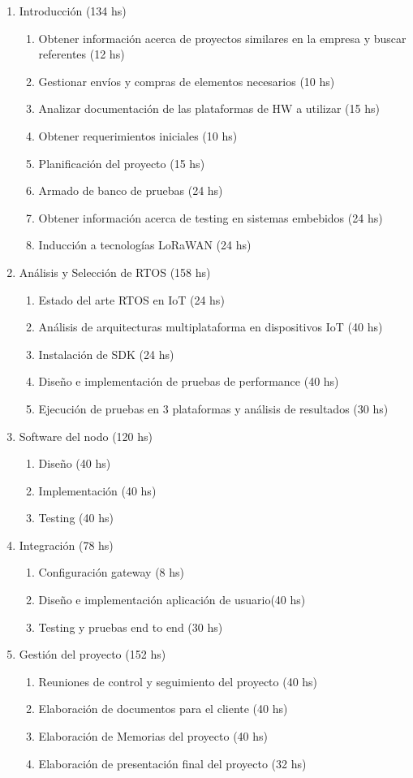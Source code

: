 \documentclass[11pt]{charter}
\begin{document}
\begin{enumerate}
\item Introducción (134 hs)
	\begin{enumerate}
	\item Obtener información acerca de proyectos similares en la empresa y buscar referentes (12 hs)
	\item Gestionar envíos y compras de elementos necesarios (10 hs)
	\item Analizar documentación de las plataformas de HW a utilizar (15 hs)
	\item Obtener requerimientos iniciales (10 hs)
	\item Planificación del proyecto (15 hs)
	\item Armado de banco de pruebas (24 hs)
	\item Obtener información acerca de testing en sistemas embebidos (24 hs)
	\item Inducción a tecnologías LoRaWAN (24 hs)
	\end{enumerate}
\item Análisis y Selección de RTOS (158 hs)
	\begin{enumerate}
	\item Estado del arte RTOS en IoT (24 hs)
	\item Análisis de arquitecturas multiplataforma en dispositivos IoT (40 hs)
	\item Instalación de SDK (24 hs)
	\item Diseño e implementación de pruebas de performance (40 hs)
	\item Ejecución de pruebas en 3 plataformas y análisis de resultados (30 hs)
	\end{enumerate}	
\item Software del nodo (120 hs)
	\begin{enumerate}
	\item Diseño (40 hs)
	\item Implementación (40 hs)
	\item Testing (40 hs)
	\end{enumerate}
\item Integración (78 hs)
	\begin{enumerate}
	\item Configuración gateway (8 hs)
	\item Diseño e implementación aplicación de usuario(40 hs)
	\item Testing y pruebas end to end (30 hs)
	\end{enumerate}
\item Gestión del proyecto (152 hs)
	\begin{enumerate}
	\item Reuniones de control y seguimiento del proyecto (40 hs)
	\item Elaboración de documentos para el cliente (40 hs)
	\item Elaboración de Memorias del proyecto (40 hs)
	\item Elaboración de presentación final del proyecto (32 hs)
	\end{enumerate}
\end{enumerate}
\end{document}
